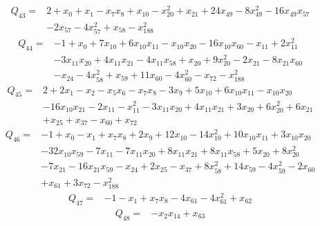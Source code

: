 \begin{equation*}\begin{aligned}
Q_{43}={}& 2+x_{0}+x_{1}-x_{7}x_{8}+x_{10}-x_{20}^{2}+x_{21}+24x_{49}-8x_{49}^{2}-16x_{49}x_{57}\\
& -2x_{57}-4x_{57}^{2}+x_{58}-x_{188}^{2}
\end{aligned}\end{equation*}
\begin{equation*}\begin{aligned}
Q_{44}={}& -1+x_{0}+7x_{10}+6x_{10}x_{11}-x_{10}x_{20}-16x_{10}x_{60}-x_{11}+2x_{11}^{2}\\
& -3x_{11}x_{20}+4x_{11}x_{21}-4x_{11}x_{58}+x_{20}+9x_{20}^{2}-2x_{21}-8x_{21}x_{60}\\
& -x_{24}-4x_{58}^{2}+x_{59}+11x_{60}-4x_{60}^{2}-x_{72}-x_{188}^{2}
\end{aligned}\end{equation*}
\begin{equation*}\begin{aligned}
Q_{45}={}& 2+2x_{1}-x_{2}-x_{5}x_{6}-x_{7}x_{8}-3x_{9}+5x_{10}+6x_{10}x_{11}-x_{10}x_{20}\\
& -16x_{10}x_{21}-2x_{11}-x_{11}^{2}-3x_{11}x_{20}+4x_{11}x_{21}+3x_{20}+6x_{20}^{2}+6x_{21}\\
& +x_{25}+x_{37}-x_{60}+x_{72}
\end{aligned}\end{equation*}
\begin{equation*}\begin{aligned}
Q_{46}={}& -1+x_{0}-x_{1}+x_{7}x_{8}+2x_{9}+12x_{10}-14x_{10}^{2}+10x_{10}x_{11}+3x_{10}x_{20}\\
& -32x_{10}x_{59}-7x_{11}-7x_{11}x_{20}+8x_{11}x_{21}+8x_{11}x_{58}+5x_{20}+8x_{20}^{2}\\
& -7x_{21}-16x_{21}x_{59}-x_{24}+2x_{25}-x_{37}+8x_{58}^{2}+14x_{59}-4x_{59}^{2}-2x_{60}\\
& +x_{61}+3x_{72}-x_{188}^{2}
\end{aligned}\end{equation*}
\begin{equation*}\begin{aligned}
Q_{47}={}& -1-x_{1}+x_{7}x_{8}-4x_{61}-4x_{61}^{2}+x_{62}
\end{aligned}\end{equation*}
\begin{equation*}\begin{aligned}
Q_{48}={}& -x_{2}x_{14}+x_{63}
\end{aligned}\end{equation*}
